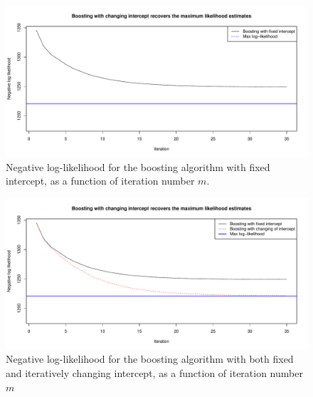 \begin{figure}
\caption{Negative log-likelihood for the boosting algorithm with fixed intercept, as a function of iteration number $m$.}
\label{fig:boosting-ML-fixed-only}
\centering\includegraphics[scale=0.4]{figures/case1_fixed_only.pdf}
\end{figure}

\begin{figure}
\caption{Negative log-likelihood for the boosting algorithm with both fixed and iteratively changing intercept, as a function of iteration number $m$}
\label{fig:boosting-ML}
\centering\includegraphics[scale=0.4]{figures/small_example.pdf}
\end{figure}

